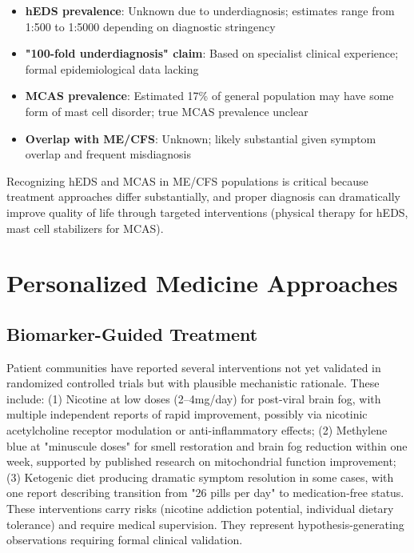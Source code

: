 \begin{observation}
\begin{itemize}
    \item \textbf{hEDS prevalence}: Unknown due to underdiagnosis; estimates range from 1:500 to 1:5000 depending on diagnostic stringency
    \item \textbf{"100-fold underdiagnosis" claim}: Based on specialist clinical experience; formal epidemiological data lacking
    \item \textbf{MCAS prevalence}: Estimated 17\% of general population may have some form of mast cell disorder; true MCAS prevalence unclear
    \item \textbf{Overlap with ME/CFS}: Unknown; likely substantial given symptom overlap and frequent misdiagnosis
\end{itemize}

Recognizing hEDS and MCAS in ME/CFS populations is critical because treatment approaches differ substantially, and proper diagnosis can dramatically improve quality of life through targeted interventions (physical therapy for hEDS, mast cell stabilizers for MCAS).
\end{observation}

\section{Personalized Medicine Approaches}
\label{sec:personalized-medicine}

\subsection{Biomarker-Guided Treatment}

\begin{speculation}
\label{spec:patient-interventions}
Patient communities have reported several interventions not yet validated in randomized controlled trials but with plausible mechanistic rationale. These include: (1) Nicotine at low doses (2--4mg/day) for post-viral brain fog, with multiple independent reports of rapid improvement, possibly via nicotinic acetylcholine receptor modulation or anti-inflammatory effects; (2) Methylene blue at "minuscule doses" for smell restoration and brain fog reduction within one week, supported by published research on mitochondrial function improvement; (3) Ketogenic diet producing dramatic symptom resolution in some cases, with one report describing transition from "26 pills per day" to medication-free status. These interventions carry risks (nicotine addiction potential, individual dietary tolerance) and require medical supervision. They represent hypothesis-generating observations requiring formal clinical validation.
\end{speculation}


